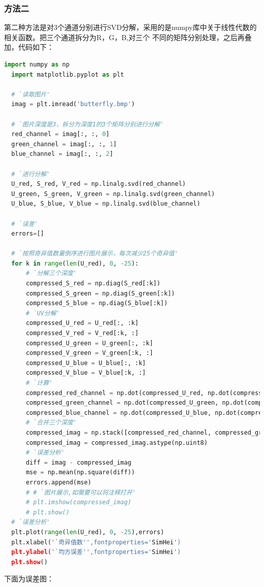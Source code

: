 \documentclass[UTF8]{ctexart}
\begin{document}
\subsubsection{方法二}
第二种方法是对3个通道分别进行SVD分解，采用的是numpy库中关于线性代数的相关函数。把三个通道拆分为R，G，B,对三个
不同的矩阵分别处理，之后再叠加，代码如下：
\begin{lstlisting}[language=Python]
  import numpy as np
  import matplotlib.pyplot as plt
  
  # `读取图片'
  imag = plt.imread('butterfly.bmp')
  
  # `图片深度是3，拆分为深度1的3个矩阵分别进行分解'
  red_channel = imag[:, :, 0]
  green_channel = imag[:, :, 1]
  blue_channel = imag[:, :, 2]
  
  # `进行分解'
  U_red, S_red, V_red = np.linalg.svd(red_channel)
  U_green, S_green, V_green = np.linalg.svd(green_channel)
  U_blue, S_blue, V_blue = np.linalg.svd(blue_channel)
  
  # `误差'
  errors=[]
  
  # `按照奇异值数量倒序进行图片展示，每次减少25个奇异值'
  for k in range(len(U_red), 0, -25):
      # `分解三个深度'
      compressed_S_red = np.diag(S_red[:k])
      compressed_S_green = np.diag(S_green[:k])
      compressed_S_blue = np.diag(S_blue[:k])
      # `UV分解'
      compressed_U_red = U_red[:, :k]
      compressed_V_red = V_red[:k, :]
      compressed_U_green = U_green[:, :k]
      compressed_V_green = V_green[:k, :]
      compressed_U_blue = U_blue[:, :k]
      compressed_V_blue = V_blue[:k, :]
      # `计算'
      compressed_red_channel = np.dot(compressed_U_red, np.dot(compressed_S_red, compressed_V_red))
      compressed_green_channel = np.dot(compressed_U_green, np.dot(compressed_S_green, compressed_V_green))
      compressed_blue_channel = np.dot(compressed_U_blue, np.dot(compressed_S_blue, compressed_V_blue))
      # `合并三个深度'
      compressed_imag = np.stack([compressed_red_channel, compressed_green_channel, compressed_blue_channel], axis=2)
      compressed_imag = compressed_imag.astype(np.uint8)
      # `误差分析'
      diff = imag - compressed_imag
      mse = np.mean(np.square(diff))
      errors.append(mse)
      # # `图片展示,如需要可以将注释打开'
      # plt.imshow(compressed_imag)
      # plt.show()
  # `误差分析'
  plt.plot(range(len(U_red), 0, -25),errors)
  plt.xlabel('`奇异值数'',fontproperties='SimHei')
  plt.ylabel('`均方误差'',fontproperties='SimHei')
  plt.show() 
 \end{lstlisting}
 下面为误差图：
 
\end{document}
